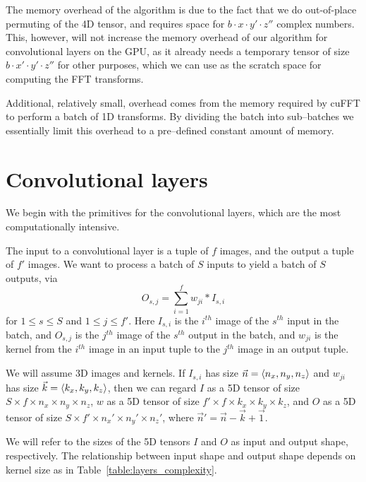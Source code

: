 \documentclass[conference]{./IEEEtran/IEEEtran}
\DeclarePairedDelimiter{\angled}{\langle}{\rangle}
\begin{document}
  The memory overhead of the algorithm is due to the fact that we do
  out-of-place permuting of the 4D tensor, and requires space for $b
  \cdot x \cdot y' \cdot z''$ complex numbers.  This, however, will
  not increase the memory overhead of our algorithm for convolutional
  layers on the GPU, as it already needs a temporary tensor of size $b
  \cdot x' \cdot y' \cdot z''$ for other purposes, which we can use as
  the scratch space for computing the FFT transforms.

  Additional, relatively small, overhead comes from the memory
  required by cuFFT to perform a batch of 1D transforms.  By dividing
  the batch into sub--batches we essentially limit this overhead to a
  pre--defined constant amount of memory.


\section{Convolutional layers}

  We begin with the primitives for the convolutional layers, which are
  the most computationally intensive.

  The input to a convolutional layer is a tuple of $f$ images, and the
  output a tuple of $f'$ images.  We want to process a batch of $S$
  inputs to yield a batch of $S$ outputs, via
  \[
  O_{s,j} = \sum_{i=1}^f w_{ji}\ast I_{s,i}
  \]
  for $1 \le s \le S$ and $1 \le j \le f'$.  Here $I_{s,i}$ is the
  $i^{th}$ image of the $s^{th}$ input in the batch, and $O_{s,j}$ is
  the $j^{th}$ image of the $s^{th}$ output in the batch, and $w_{ji}$
  is the kernel from the $i^{th}$ image in an input tuple to the
  $j^{th}$ image in an output tuple.

  We will assume 3D images and kernels.  If $I_{s,i}$ has size
  $\vec{n} = \angled{n_x, n_y, n_z}$ and $w_{ji}$ has size $\vec{k} =
  \angled{k_x,k_y,k_z}$, then we can regard $I$ as a 5D tensor of size
  $S \times f \times n_x \times n_y \times n_z$, $w$ as a 5D tensor of
  size $f' \times f \times k_x \times k_y \times k_z$, and $O$ as a 5D
  tensor of size $S \times f' \times n_x' \times n_y' \times n_z'$,
  where $\vec{n}' = \vec{n} - \vec{k} + \vec{1}$.

  We will refer to the sizes of the 5D tensors $I$ and $O$ as input
  and output shape, respectively.  The relationship between input
  shape and output shape depends on kernel size as in
  Table~\ref{table:layers_complexity}.
\end{document}
